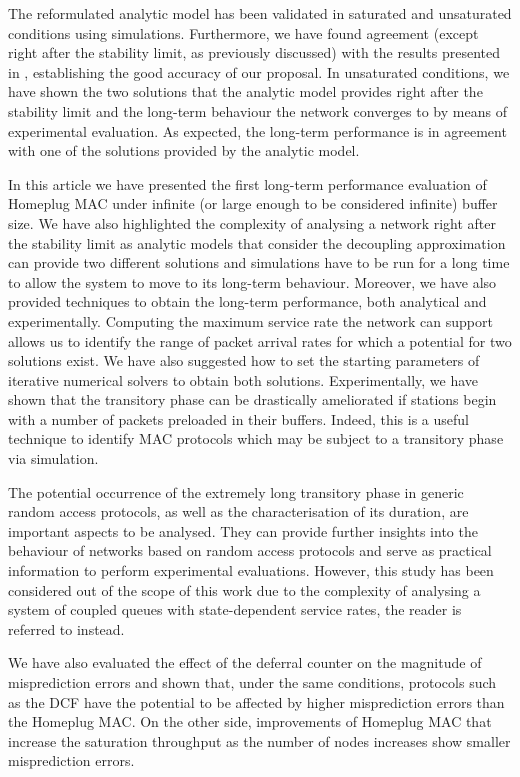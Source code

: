 \documentclass[preprint,12pt]{elsarticle}
\begin{document}
The reformulated analytic model has been validated in saturated and unsaturated conditions using simulations. Furthermore, we have found agreement (except right after the stability limit, as previously discussed) with the results presented in \cite{chung2006performance}, establishing the good accuracy of our proposal. In unsaturated conditions, we have shown the two solutions that the analytic model provides right after the stability limit and the long-term behaviour the network converges to by means of experimental evaluation. As expected, the long-term performance is in agreement with one of the solutions provided by the analytic model. 

In this article we have presented the first long-term performance evaluation of Homeplug MAC under infinite (or large enough to be considered infinite) buffer size. We have also highlighted the complexity of analysing a network right after the stability limit as analytic models that consider the decoupling approximation can provide two different solutions and simulations have to be run for a long time to allow the system to move to its long-term behaviour. Moreover, we have also provided techniques to obtain the long-term performance, both analytical and experimentally. Computing the maximum service rate the network can support allows us to identify the range of packet arrival rates for which a potential for two solutions exist. We have also suggested how to set the starting parameters of iterative numerical solvers to obtain both solutions. Experimentally, we have shown that the transitory phase can be drastically ameliorated if stations begin with a number of packets preloaded in their buffers. Indeed, 
this is a useful technique to identify MAC protocols which may be subject to a transitory phase via simulation. 

The potential occurrence of the extremely long transitory phase in generic random access protocols, as well as the characterisation of its duration, are important aspects to be analysed. They can provide further insights into the behaviour of networks based on random access protocols and serve as practical information to perform experimental evaluations. However, this study has been considered out of the scope of this work due to the complexity of analysing a system of coupled queues with state-dependent service rates, the reader is referred to \cite{cano2014longtrans} instead.

We have also evaluated the effect of the deferral counter on the magnitude of misprediction errors and shown that, under the same conditions, protocols such as the DCF have the potential to be affected by higher misprediction errors than the Homeplug MAC. On the other side, improvements of Homeplug MAC that increase the saturation throughput as the number of nodes increases show smaller misprediction errors.
\end{document}
